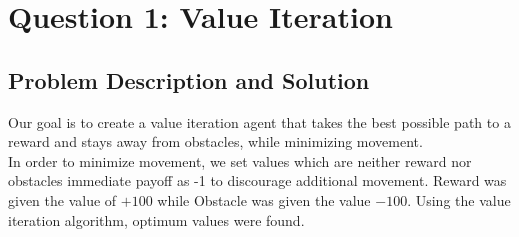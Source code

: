 \documentclass[a4paper, 11pt]{article}
\begin{document}
\let\endtitlepage\relax
{}
\noindent\makebox[\linewidth]{\rule{\textwidth}{0.4pt}}
\tableofcontents
\noindent\makebox[\linewidth]{\rule{\textwidth}{0.4pt}}
\newpage
\section{Question 1: Value Iteration}
\subsection{Problem Description and Solution}
Our goal is to create a value iteration agent that takes the best possible path to a reward and stays away from obstacles, while minimizing movement. \\
In order to minimize movement, we set values which are neither reward nor obstacles immediate payoff as -1 to discourage additional movement. Reward was given the value of $+100$ while Obstacle was given the value $-100$. Using the value iteration algorithm, optimum values were found.
\end{document}

